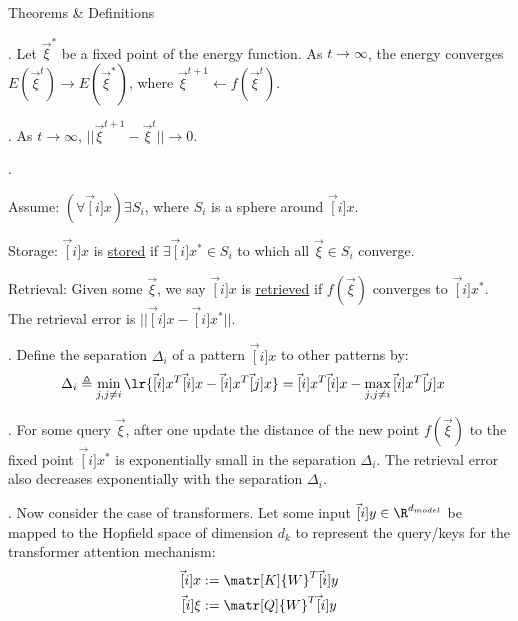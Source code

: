 \documentclass[11pt]{article}
\begin{document}
\begin{itemdefinition}{Theorems \& Definitions}{}
	\item {}.	Let $\vec\xi^*$ be a fixed point of the energy function. As $t \rightarrow \infty$, the energy converges $E(\vec\xi^t) \rightarrow E(\vec\xi^*)$, where $\vec\xi^{t+1} \leftarrow f(\vec\xi^t)$. 
	
	\item {}. As $t \rightarrow \infty$, $||\vec\xi^{t+1} - \vec\xi^t ||  \rightarrow 0$. 
	
	\item {}. 
	\begin{compactitem}
		\item Assume:  $(\forall \vec[i]{x}) \exists S_i$, where $S_i$ is a sphere around $\vec[i]{x}$. 
		\item Storage: $\vec[i]{x}$ is \underline{stored} if $\exists \vec[i]{x}^* \in S_i$ to which all $\vec\xi \in S_i$ converge. 
		\item Retrieval: Given some $\vec\xi$, we say $\vec[i]{x}$ is \underline{retrieved} if $f(\vec\xi)$ converges to $\vec[i]{x}^*$. The retrieval error is $||\vec[i]{x} - \vec[i]{x}^*||$. 
	\end{compactitem}

	\item {}. Define the separation $\Delta_i$ of a pattern $\vec[i]{x}$ to other patterns by:
	\begin{align}
		\Delta_i 
			&\triangleq \min_{j, j\neq i} \lr{  \vec[i]{x}^T \vec[i]{x} - \vec[i]{x}^T \vec[j]{x}   } 
			= \vec[i]{x}^T \vec[i]{x} - \max_{j, j \neq i} \vec[i]{x}^T \vec[j]{x}
	\end{align}

	\item {}. For some query $\vec\xi$, after one update the distance of the new point $f(\vec\xi)$ to the fixed point $\vec[i]{x}^*$ is exponentially small in the separation $\Delta_i$.  The retrieval error also decreases exponentially with the separation $\Delta_i$. 
\end{itemdefinition}

. Now consider the case of transformers. Let some input $\vec[i]{y} \in \R^{d_{model}}$ be mapped to the Hopfield space of dimension $d_k$ to represent the query/keys for the transformer attention mechanism:
\begin{align}
	\vec[i]{x} &:= \matr[K]{W}^T \vec[i]{y} \\
	\vec[i]{\xi} &:= \matr[Q]{W}^T \vec[i]{y}
\end{align}
\end{document}
